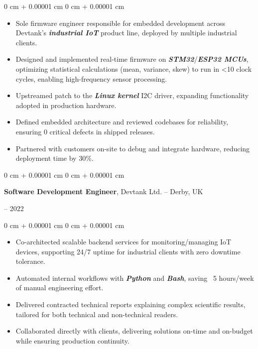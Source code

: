 \documentclass[10pt, letterpaper]{article}
\newenvironment{highlights}{
    \begin{itemize}[
        topsep=0.2 cm,
        parsep=0.2 cm,
        partopsep=0pt,
        itemsep=0.025 cm,
        leftmargin=0 cm + 10pt
    ]
}{
    \end{itemize}
}
\newenvironment{onecolentry}{
    \begin{adjustwidth}{
        0 cm + 0.00001 cm
    }{
        0 cm + 0.00001 cm
    }
}{
    \end{adjustwidth}
}
\newenvironment{twocolentry}[2][]{
    \onecolentry
    \def\secondColumn{#2}
    \setcolumnwidth{\fill, 4.75 cm}
    \begin{paracol}{2}
}{
    \switchcolumn \raggedleft \secondColumn
    \end{paracol}
    \endonecolentry
}
\begin{document}
        \vspace{0.10 cm}
        \begin{onecolentry}
            \begin{highlights}
            \item Sole firmware engineer responsible for embedded development across Devtank’s \textbf{\textit{industrial IoT}} product line, deployed by multiple industrial clients.
            \item Designed and implemented real-time firmware on \textbf{\textit{STM32}}/\textbf{\textit{ESP32 MCUs}}, optimizing statistical calculations (mean, variance, skew) to run in <10 clock cycles, enabling high-frequency sensor processing.
            \item Upstreamed patch to the \textbf{\textit{Linux kernel}} I2C driver, expanding functionality adopted in production hardware.
                \item Defined embedded architecture and reviewed codebases for reliability, ensuring 0 critical defects in shipped releases.
                \item Partnered with customers on-site to debug and integrate hardware, reducing deployment time by 30\%.
            \end{highlights}
        \end{onecolentry}


        \vspace{0.2 cm}

        \begin{twocolentry}{
            2020 – 2022
        }
            \textbf{Software Development Engineer}, Devtank Ltd. -- Derby, UK
        \end{twocolentry}

        \vspace{0.10 cm}
        \begin{onecolentry}
            \begin{highlights}
                \item Co-architected scalable backend services for monitoring/managing IoT devices, supporting 24/7 uptime for industrial clients with zero downtime tolerance.
                \item Automated internal workflows with \textbf{\textit{Python}} and \textbf{\textit{Bash}}, saving ~5 hours/week of manual engineering effort.
                \item Delivered contracted technical reports explaining complex scientific results, tailored for both technical and non-technical readers.
                \item Collaborated directly with clients, delivering solutions on-time and on-budget while ensuring production continuity.
            \end{highlights}
        \end{onecolentry}
\end{document}
